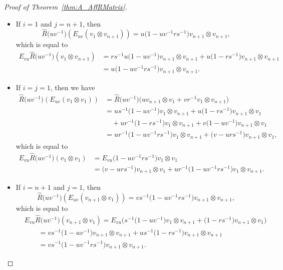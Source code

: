 \documentclass[10pt,a4paper]{amsart}
\numberwithin{equation}{section}
\begin{document}
\begin{proof}[Proof of Theorem~\ref{thm:A_AffRMatrix}]
\begin{itemize}
\item
If $i = 1$ and $j = n+ 1$, then
\begin{displaymath}
 \hat{R}\bigl(uv^{-1}\bigr)(E_{uv}(v_{1} \otimes v_{n+1})) = u\bigl(1 - uv^{-1}rs^{-1}\bigr)v_{n+ 1} \otimes v_{n+ 1},
\end{displaymath}
which is equal to
\begin{displaymath}
\begin{split}
 E_{vu}\hat{R}\bigl(uv^{-1}\bigr)(v_{1} \otimes v_{n+1}) &=
 rs^{-1}u\bigl(1 - uv^{-1}\bigr)v_{n+1} \otimes v_{n + 1} + u\bigl(1 - rs^{-1}\bigr)v_{n +1} \otimes v_{n+1} \\
 &= u\bigl(1 - uv^{-1}rs^{-1}\bigr)v_{n+1} \otimes v_{n+1}.
\end{split}
\end{displaymath}

\item
If $i = j = 1$, then we have
\begin{displaymath}
\begin{split}
 \hat{R}\bigl(uv^{-1}\bigr)(E_{uv}(v_{1} \otimes v_{1})) &{}=
 \hat{R}\bigl(uv^{-1}\bigr)\bigl(uv_{n+1} \otimes v_{1} + vr^{-1}v_{1} \otimes v_{n+1}\bigr) \\
 & = us^{-1}\bigl(1 - uv^{-1}\bigr)v_{1} \otimes v_{n+1} + u\bigl(1 - rs^{-1}\bigr)v_{n+1} \otimes v_{1} \\
 &\quad{}+ ur^{-1}\bigl(1 - rs^{-1}\bigr)v_{1} \otimes v_{n+1} + v\bigl(1 - uv^{-1}\bigr) v_{n+1} \otimes v_{1} \\
 & = ur^{-1}\bigl(1 - uv^{-1}rs^{-1}\bigr)v_{1} \otimes v_{n+1} + \bigl(v - urs^{-1}\bigr)v_{n+1} \otimes v_{1},
\end{split}
\end{displaymath}
which is equal to
\begin{displaymath}
\begin{split}
 E_{vu}\hat{R}\bigl(uv^{-1}\bigr)(v_{1} \otimes v_{1}) &=
 E_{vu}\bigl(1 - uv^{-1}rs^{-1}\bigr)v_{1} \otimes v_{1} \\
 &= \bigl(v - urs^{-1}\bigr)v_{n+1} \otimes v_{1} + ur^{-1}\bigl(1 - uv^{-1}rs^{-1}\bigr)v_{1} \otimes v_{n+1}.
\end{split}
\end{displaymath}

\item
If $i = n + 1$ and $j = 1$, then
\begin{displaymath}
 \hat{R}\bigl(uv^{-1}\bigr)(E_{uv}(v_{n+ 1} \otimes v_{1})) = vs^{-1}\bigl(1 - uv^{-1}rs^{-1}\bigr)v_{n+1} \otimes v_{n+1},
\end{displaymath}
which is equal to
\begin{align*}
 &E_{vu}\hat{R}\bigl(uv^{-1}\bigr)(v_{n+1} \otimes v_{1})
= E_{vu}\bigl(s^{-1}\bigl(1 - uv^{-1}\bigr)v_{1} \otimes v_{n+1} + \bigl(1 - rs^{-1}\bigr)v_{n+1} \otimes v_{1}\bigr) \\
 &\qquad{}= vs^{-1}\bigl(1 - uv^{-1}\bigr)v_{n+1} \otimes v_{n+1} + us^{-1}\bigl(1 - rs^{-1}\bigr)v_{n + 1} \otimes v_{n+1} \\
 &\qquad{}= vs^{-1}\bigl(1 - uv^{-1}rs^{-1}\bigr)v_{n + 1} \otimes v_{n+1}.
\end{align*}


\end{itemize}
\end{proof}
\end{document}
